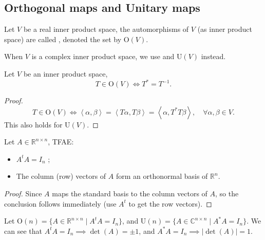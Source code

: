 \subsection{Orthogonal maps and Unitary maps}
\label{sub:Orthogonal maps and Unitary maps}

\begin{definition}
	Let $V$ be a real inner product space, the automorphisms of $V$
	(as inner product space) are
	called , denoted the set by $\mathrm{O}(V)$.

	When $V$ is a complex inner product space,
	we use  and $\mathrm{U}(V)$ instead.
\end{definition}

\begin{proposition}
	Let $V$ be an inner product space,
	\[
		T\in \mathrm{O}(V)\iff T^* = T^{-1}.
	\]
\end{proposition}
\begin{proof}[Proof]
    \[
    T\in \mathrm{O}(V) \iff \left<\alpha, \beta \right> =
	\left<T\alpha, T\beta \right> = \left<\alpha, T^*T\beta \right>,
	\quad \forall \alpha, \beta \in V.
    \]
	This also holds for $\mathrm{U}(V)$.
\end{proof}
\begin{proposition}
	Let $A\in \mathbb{R}^{n\times n}$, TFAE:
	\begin{itemize}
		\item $A^tA = I_n$ ;
		\item The column (row) vectors of $A$ form
			an orthonormal basis of $\mathbb{R}^n$.
	\end{itemize}
\end{proposition}
\begin{proof}[Proof]
    Since $A$ maps the standard basis to the column vectors of $A$,
	so the conclusion follows immediately (use $A^t$ to get the row vectors).
\end{proof}

Let $\mathrm{O}(n) = \{A\in \mathbb{R}^{n\times n}\mid A^tA = I_n\}$,
and $\mathrm{U}(n) = \{A\in \mathbb{C}^{n\times n} \mid A^*A = I_n\}$.
We can see that $A^tA = I_n \implies \det(A) = \pm 1$,
and $A^*A = I_n \implies |\det(A)| = 1$.
